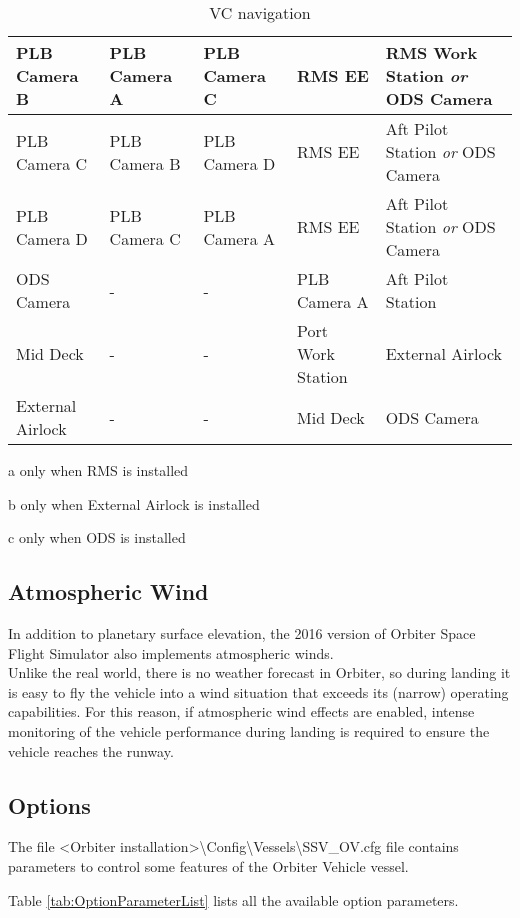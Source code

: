 \documentclass[Space_Shuttle_Vessel_Manual.tex]{subfiles}
\begin{document}
\begin{table}[H]
\begin{threeparttable}
\begin{tabular}{l|p{2.88cm} p{2.88cm} p{2.88cm} p{2.88cm} }
	\hline\rule{0pt}{2ex}
	PLB Camera B & PLB Camera A & PLB Camera C & RMS EE\tnote{a,c} & RMS Work Station \textit{or} ODS Camera\tnote{c}\\
	\hline\rule{0pt}{2ex}
	PLB Camera C & PLB Camera B & PLB Camera D & RMS EE\tnote{a,c} & Aft Pilot Station \textit{or} ODS Camera\tnote{c}\\
	\hline\rule{0pt}{2ex}
	PLB Camera D & PLB Camera C & PLB Camera A & RMS EE\tnote{a,c} & Aft Pilot Station \textit{or} ODS Camera\tnote{c}\\
	\hline\rule{0pt}{2ex}
	ODS Camera\tnote{c} & - & - & PLB Camera A & Aft Pilot Station\\
	\hline\rule{0pt}{2ex}
	Mid Deck & - & - & Port Work Station & External Airlock\tnote{b}\\
	\hline\rule{0pt}{2ex}
	External Airlock\tnote{b} & - & - & Mid Deck & ODS Camera\tnote{c}\\
  \end{tabular}
	\begin{tablenotes}
		\item[a] only when RMS is installed
		\item[b] only when External Airlock is installed
		\item[c] only when ODS is installed
	\end{tablenotes}
	\end{threeparttable}
  \caption{VC navigation}
  \label{tab:VC_navigation}
\end{table}


\begin{multicols*}{2}
\subsection{Atmospheric Wind}
In addition to planetary surface elevation, the 2016 version of Orbiter Space Flight Simulator also implements atmospheric winds.\\
Unlike the real world, there is no weather forecast in Orbiter, so during landing it is easy to fly the vehicle into a wind situation that exceeds its (narrow) operating capabilities. For this reason, if atmospheric wind effects are enabled, intense monitoring of the vehicle performance during landing is required to ensure the vehicle reaches the runway.\\


\subsection{Options}
The file <Orbiter installation>\textbackslash Config\textbackslash Vessels\textbackslash SSV\_OV.cfg file contains parameters to control some features of the Orbiter Vehicle vessel.\\


Table \ref{tab:OptionParameterList} lists all the available option parameters.

\end{multicols*}
\end{document}
